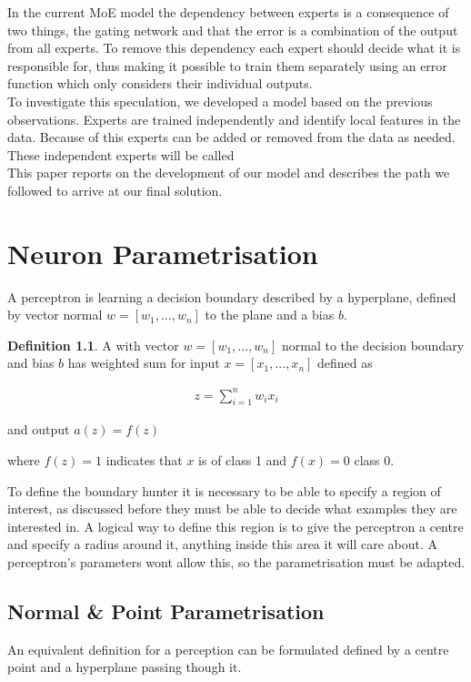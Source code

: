 \documentclass[notitlepage]{report}
\theoremstyle{definition}
\newtheorem{definition}{Definition}[section]
\begin{document}
In the current MoE model the dependency between experts is a consequence of two things, the gating network and that the error is a combination of the output from all experts. To remove this dependency each expert should decide what it is responsible for, thus making it possible to train them separately using an error function which only considers their individual outputs. \\

To investigate this speculation, we developed a model based on the previous observations. Experts are trained independently and identify local features in the data. Because of this experts can be added or removed from the data as needed. These independent experts will be called \\

This paper reports on the development of our model and describes the path we followed to arrive at our final solution.

\chapter{Neuron Parametrisation}
A perceptron is learning a decision boundary described by a hyperplane, defined by vector normal $w = [w_1, ..., w_n]$ to the plane and a bias $b$.

\theoremstyle{definition}
\begin{definition}
	A  with vector $w = [w_1, ..., w_n]$ normal to the decision boundary and bias $b$ has weighted sum for input $x = [x_1, ..., x_n]$ defined as
	
	\begin{align*}
		z = \sum_{i=1}^{n} w_i x_i
	\end{align*}
	
	and output $a(z) = f(z)$
	
	where $f(z) = 1$ indicates that $x$ is of class 1 and $f(x) = 0$ class 0.
\end{definition}

To define the boundary hunter it is necessary to be able to specify a region of interest, as discussed before they must be able to decide what examples they are interested in. A logical way to define this region is to give the perceptron a centre and specify a radius around it, anything inside this area it will care about. A perceptron's parameters wont allow this, so the parametrisation must be adapted.

\section{Normal \& Point Parametrisation}
An equivalent definition for a perception can be formulated defined by a centre point and a hyperplane passing though it.
\end{document}

